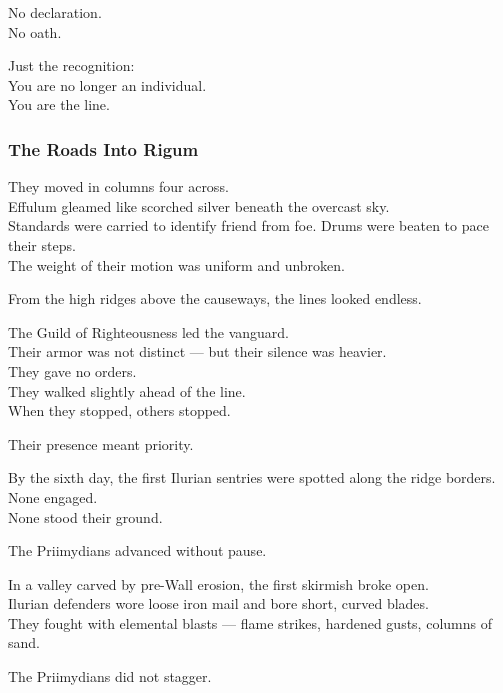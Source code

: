 \documentclass[12pt]{article}
\begin{document}
No declaration.\\
No oath.

Just the recognition:\\
You are no longer an individual.\\
You are the line.

\dotfill

\subsubsection{The Roads Into Rigum}

They moved in columns four across.\\
Effulum gleamed like scorched silver beneath the overcast sky.\\
Standards were carried to identify friend from foe. Drums were beaten to pace their steps.\\
The weight of their motion was uniform and unbroken.

From the high ridges above the causeways, the lines looked endless.

\vspace{1em}

The Guild of Righteousness led the vanguard.\\
Their armor was not distinct — but their silence was heavier.\\
They gave no orders.\\
They walked slightly ahead of the line.\\
When they stopped, others stopped.

Their presence meant priority.

\vspace{1em}

By the sixth day, the first Ilurian sentries were spotted along the ridge borders.\\
None engaged.\\
None stood their ground.

The Priimydians advanced without pause.

\vspace{1em}

In a valley carved by pre-Wall erosion, the first skirmish broke open.\\
Ilurian defenders wore loose iron mail and bore short, curved blades.\\
They fought with elemental blasts — flame strikes, hardened gusts, columns of sand.

The Priimydians did not stagger.
\end{document}
